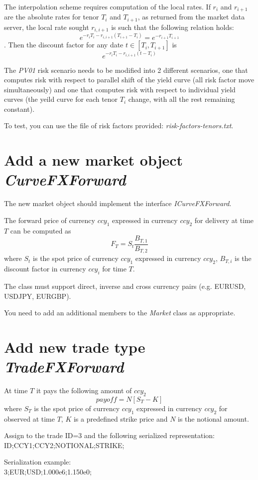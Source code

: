 \documentclass[10pt]{article}
\begin{document}
The interpolation scheme requires computation of the local rates. If $r_i$ and $r_{i+1}$ are the absolute rates for tenor $T_i$ and $T_{i+1}$, as returned from the market data server, the local rate sought $r_{i,i+1}$ is such that the following relation holds:
 $$e^{-r_iT_i-r_{i,i+1}(T_{i+1}-T_i)}=e^{-r_{i+1}T_{i+1}}$$.
Then the discount factor for any date $t \in [T_i,T_{i+1}]$ is $$e^{-r_i T_i-r_{i,i+1}(t-T_i)}$$

The \textit{PV01} risk scenario needs to be modified into 2 different scenarios, one that computes risk with respect to parallel shift of the yield curve (all risk factor move simultaneously) and one that computes risk with respect to individual yield curves (the yeild curve for each tenor $T_i$ change, with all the rest remaining constant).

To test, you can use the file of risk factors provided: \textit{risk-factors-tenors.txt}.

\section{Add a new market object \textit{CurveFXForward}}
The new market object should implement the interface \textit{ICurveFXForward}.

The forward price of currency $ccy_1$ expressed in currency $ccy_2$ for delivery at time $T$ can be computed as
$$F_T=S_t \frac{B_{T,1}}{B_{T,2}}$$
where $S_t$ is the spot price of currency $ccy_1$ expressed in currency $ccy_2$, $B_{T,i}$ is the discount factor in currency $ccy_i$ for time $T$.

The class must support direct, inverse and cross currency pairs (e.g. EURUSD, USDJPY, EURGBP).

You need to add an additional members to the \textit{Market} class as appropriate.

\section{Add new trade type \textit{TradeFXForward}}
At time $T$ it pays the following amount of $ccy_2$
$$
payoff=N[S_T-K]
$$
where $S_T$ is the spot price of currency $ccy_1$ expressed in currency $ccy_2$ for observed at time $T$, $K$ is a predefined strike price and $N$ is the notional amount.

Assign to the trade ID=3 and the following serialized representation:\\
ID;CCY1;CCY2;NOTIONAL;STRIKE;

Serialization example:\\
3;EUR;USD;1.000e6;1.150e0;
\end{document}
